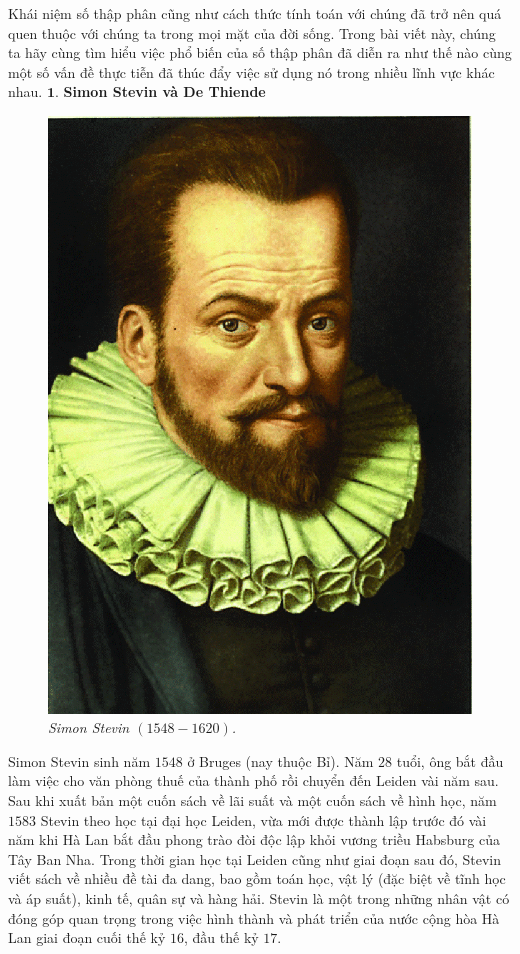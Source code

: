 \begin{multicols}{2}
	Khái niệm số thập phân cũng như cách thức tính toán với chúng đã trở nên quá quen thuộc với chúng ta trong mọi mặt của đời sống. Trong bài viết này, chúng ta hãy cùng tìm hiểu việc phổ biến của số thập phân đã diễn ra như thế nào cùng một số vấn đề thực tiễn đã thúc đẩy việc sử dụng nó trong nhiều lĩnh vực khác nhau.
	\vskip 0.1cm
	$\pmb{1.}$ \textbf{\color{toanhocdoisong}Simon Stevin và De Thiende }
	\begin{figure}[H]
		\vspace*{-5pt}
		\centering
		\captionsetup{labelformat= empty, justification=centering}
		\includegraphics[width= 0.7\linewidth]{1}
		\caption{\small\textit{\color{toanhocdoisong}Simon Stevin $(1548-1620)$.}}
		\vspace*{-10pt}
	\end{figure}
	Simon Stevin sinh năm $1548$ ở Bruges (nay thuộc Bỉ). Năm $28$ tuổi, ông bắt đầu làm việc cho văn phòng thuế của thành phố rồi chuyển đến Leiden vài năm sau. Sau khi xuất bản một cuốn sách về lãi suất và một cuốn sách về hình học, năm $1583$ Stevin theo học tại đại học Leiden, vừa mới được thành lập trước đó vài năm khi Hà Lan bắt đầu phong trào đòi độc lập khỏi vương triều Habsburg của Tây Ban Nha. Trong thời gian học tại Leiden cũng như giai đoạn sau đó, Stevin viết sách về nhiều đề tài đa dang, bao gồm toán học, vật lý (đặc biệt về tĩnh học và áp suất), kinh tế, quân sự và hàng hải. Stevin là một trong những nhân vật có đóng góp quan trọng trong việc hình thành và phát triển của nước cộng hòa Hà Lan giai đoạn cuối thế kỷ $16$, đầu thế kỷ $17$.
	

\end{multicols}
